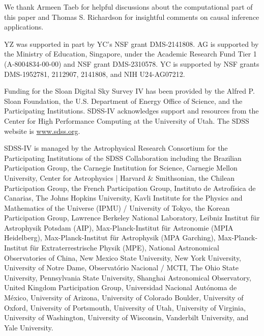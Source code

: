\documentclass[ejsv2,noshowframe]{imsart}
\theoremstyle{plain}
\theoremstyle{definition}
\theoremstyle{remark}
\begin{document}
\begin{acks}[Acknowledgments]
We thank Armeen Taeb for helpful discussions about the computational part of this paper and Thomas S. Richardson for insightful comments on causal inference applications.
\end{acks}

\begin{funding}
YZ was supported in part by YC's NSF grant DMS-2141808. AG is supported by the Ministry of Education, Singapore, under the Academic Research Fund Tier 1 (A-8004834-00-00) and NSF grant DMS-2310578. YC is supported by NSF grants DMS-1952781, 2112907, 2141808, and NIH U24-AG07212.


Funding for the Sloan Digital Sky Survey IV has been provided by the 
Alfred P. Sloan Foundation, the U.S. Department of Energy Office of 
Science, and the Participating Institutions. SDSS-IV acknowledges support and resources from the Center for High Performance Computing  at the University of Utah. The SDSS website is \url{www.sdss.org}.

SDSS-IV is managed by the Astrophysical Research Consortium for the Participating Institutions of the SDSS Collaboration including 
the Brazilian Participation Group, the Carnegie Institution for Science, 
Carnegie Mellon University, Center for Astrophysics | Harvard \& Smithsonian, the Chilean Participation Group, the French Participation Group, Instituto de Astrof\'isica de Canarias, The Johns Hopkins University, Kavli Institute for the Physics and Mathematics of the 
Universe (IPMU) / University of Tokyo, the Korean Participation Group, Lawrence Berkeley National Laboratory, Leibniz Institut f\"ur Astrophysik Potsdam (AIP), Max-Planck-Institut f\"ur Astronomie (MPIA Heidelberg), Max-Planck-Institut f\"ur Astrophysik (MPA Garching), Max-Planck-Institut f\"ur Extraterrestrische Physik (MPE), National Astronomical Observatories of China, New Mexico State University, 
New York University, University of Notre Dame, Observat\'orio Nacional / MCTI, The Ohio State University, Pennsylvania State 
University, Shanghai Astronomical Observatory, United Kingdom Participation Group, Universidad Nacional Aut\'onoma de M\'exico, University of Arizona, University of Colorado Boulder, 
University of Oxford, University of Portsmouth, University of Utah, 
University of Virginia, University of Washington, University of Wisconsin, Vanderbilt University, and Yale University.
\end{funding}
\end{document}
